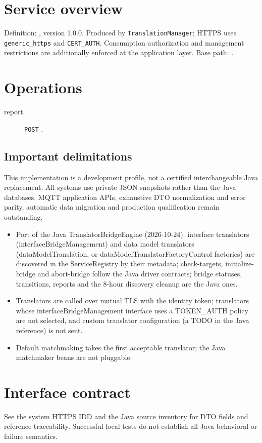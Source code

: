 \documentclass[a4paper]{arrowhead}
\begin{document}
\ArrowheadSetup
\section{Service overview}
Definition: , version 1.0.0. Produced by \texttt{TranslationManager}; HTTPS uses \texttt{generic\_https} and \texttt{CERT\_AUTH}. Consumption authorization and management restrictions are additionally enforced at the application layer. Base path: .
\section{Operations}
\begin{description}
\item[report] \texttt{POST} .
\end{description}
\subsection{Important delimitations}
This implementation is a development profile, not a certified interchangeable Java replacement. All systems use private JSON snapshots rather than the Java databases. MQTT application APIs, exhaustive DTO normalization and error parity, automatic data migration and production qualification remain outstanding.
\begin{itemize}
\item Port of the Java TranslatorBridgeEngine (2026-10-24): interface translators (interfaceBridgeManagement) and data model translators (dataModelTranslation, or dataModelTranslatorFactoryControl factories) are discovered in the ServiceRegistry by their metadata; check-targets, initialize-bridge and abort-bridge follow the Java driver contracts; bridge statuses, transitions, reports and the 8-hour discovery cleanup are the Java ones.
\item Translators are called over mutual TLS with the identity token; translators whose interfaceBridgeManagement interface uses a TOKEN\_AUTH policy are not selected, and custom translator configuration (a TODO in the Java reference) is not sent.
\item Default matchmaking takes the first acceptable translator; the Java matchmaker beans are not pluggable.
\end{itemize}
\section{Interface contract}
See the system HTTPS IDD and the Java source inventory for DTO fields and reference traceability. Successful local tests do not establish all Java behavioral or failure semantics.
\end{document}
